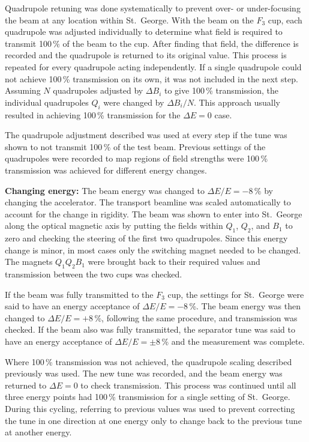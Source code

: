 Quadrupole retuning was done systematically to prevent over- or
under-focusing the beam at any location within St.\ George. With the
beam on the $F_3$ cup, each quadrupole was adjusted individually to
determine what field is required to transmit 100\,\% of the beam to the
cup. After finding that field, the difference is recorded and the
quadrupole is returned to its original value. This process is repeated
for every quadrupole acting independently. If a single quadrupole could
not achieve 100\,\% transmission on its own, it was not included in the
next step. Assuming $N$ quadrupoles adjusted by $\Delta B_i$ to give
100\,\% transmission, the individual quadrupoles $Q_i$ were changed by
$\Delta B_i / N$. This approach usually resulted in achieving 100\,\%
transmission for the $\Delta E = 0$ case.

The quadrupole adjustment described was used at every step if the tune
was shown to not transmit 100\,\% of the test beam. Previous settings of
the quadrupoles were recorded to map regions of field strengths were
100\,\% transmission was achieved for different energy changes.

\textbf{Changing energy:}
The beam energy was changed to $\Delta E/E = -8$\,\% by changing the
accelerator. The transport beamline was scaled automatically to account
for the change in rigidity. The beam was shown to enter into St.\ George
along the optical magnetic axis by putting the fields within $Q_1$,
$Q_2$, and $B_1$ to zero and checking the steering of the first two
quadrupoles. Since this energy change is minor, in most cases only the
switching magnet needed to be changed. The magnets $Q_1Q_2B_1$ were
brought back to their required values and transmission between the two
cups was checked.

If the beam was fully transmitted to the $F_3$ cup, the settings for
St.\ George were said to have an energy acceptance of $\Delta E/E =
-8$\,\%. The beam energy was then changed to $\Delta E/E = + 8$\,\%,
following the same procedure, and transmission was checked. If the beam
also was fully transmitted, the separator tune was said to have an
energy acceptance of $\Delta E/E = \pm 8$\,\% and the measurement was
complete.

Where 100\,\% transmission was not achieved, the quadrupole scaling
described previously was used. The new tune was recorded, and the beam
energy was returned to $\Delta E = 0$ to check transmission. This
process was continued until all three energy points had 100\,\%
transmission for a single setting of St.\ George. During this cycling,
referring to previous values was used to prevent correcting the tune in
one direction at one energy only to change back to the previous tune at
another energy.

